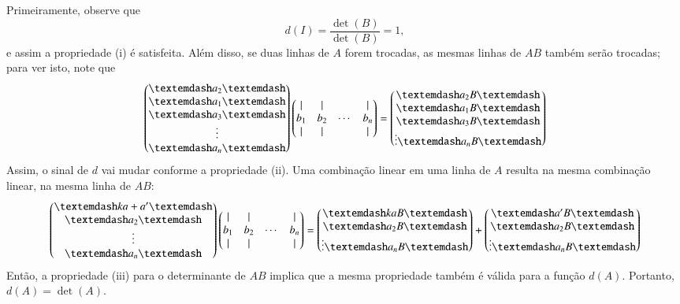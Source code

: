 \begin{itemize}
Primeiramente, observe que
\begin{equation*}
	d(I) = \frac{\det(B)}{\det(B)} = 1,
\end{equation*}
e assim a propriedade (i) é satisfeita. Além disso, se duas linhas de $A$ forem trocadas, as mesmas linhas de $AB$ também serão trocadas; para ver isto, note que
\begin{equation*}
	\begin{pmatrix}
    \textemdash a_2 \textemdash\\
    \textemdash a_1 \textemdash\\
    \textemdash a_3 \textemdash\\
    \vdots\\
    \textemdash a_n \textemdash
    \end{pmatrix}
    \begin{pmatrix}
    | & | &  & |\\
    b_1 & b_2 & \cdots & b_n\\
    | & | & & |
    \end{pmatrix}
    =
    \begin{pmatrix}
    	\textemdash a_2 B \textemdash\\
        \textemdash a_1 B \textemdash\\
        \textemdash a_3 B \textemdash\\
        \vdots
        \textemdash a_n B \textemdash
    \end{pmatrix}
\end{equation*}
Assim, o sinal de $d$ vai mudar conforme a propriedade (ii). Uma combinação linear em uma linha de $A$ resulta na mesma combinação linear, na mesma linha de $AB$:
\begin{equation*}
	\begin{pmatrix}
    \textemdash k a + a' \textemdash\\
    \textemdash a_2 \textemdash\\
    \vdots\\
    \textemdash a_n \textemdash
    \end{pmatrix}
    \begin{pmatrix}
    | & | &  & |\\
    b_1 & b_2 & \cdots & b_n\\
    | & | & & |
    \end{pmatrix}
    =
    \begin{pmatrix}
    	\textemdash k a B \textemdash\\
        \textemdash a_2 B \textemdash\\
        \vdots
        \textemdash a_n B \textemdash
    \end{pmatrix}
    +
    \begin{pmatrix}
    	\textemdash a' B \textemdash\\
        \textemdash a_2 B \textemdash\\
        \vdots
        \textemdash a_n B \textemdash
    \end{pmatrix}
\end{equation*}
Então, a propriedade (iii) para o determinante de $AB$ implica que a mesma propriedade também é válida para a função $d(A)$. Portanto, $d(A) = \det(A)$.


\end{itemize}
